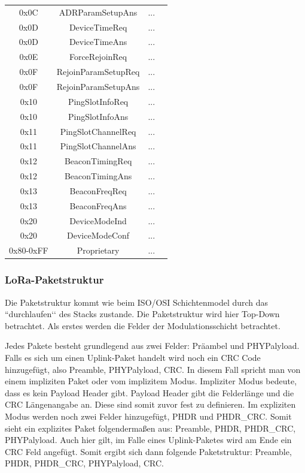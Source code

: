 \documentclass[a4paper,12pt]{article}
\begin{document}
\begin{longtable}{c |c | p{10.5cm} c}
                    0x0C & ADRParamSetupAns & ... \\
                    0x0D & DeviceTimeReq & ... \\
                    0x0D & DeviceTimeAns & ... \\
                    0x0E & ForceRejoinReq & ... \\
                    0x0F & RejoinParamSetupReq & ... \\
                    0x0F & RejoinParamSetupAns & ... \\
                    0x10 & PingSlotInfoReq & ... \\
                    0x10 & PingSlotInfoAns & ... \\
                    0x11 & PingSlotChannelReq & ... \\
                    0x11 & PingSlotChannelAns & ... \\
                    0x12 & BeaconTimingReq & ... \\
                    0x12 & BeaconTimingAns & ... \\
                    0x13 & BeaconFreqReq & ... \\
                    0x13 & BeaconFreqAns & ... \\
                    0x20 & DeviceModeInd & ... \\
                    0x20 & DeviceModeConf & ... \\
                    0x80-0xFF & Proprietary & ... \\
                    
                    
                \end{longtable}
                


            \subsubsection{LoRa-Paketstruktur}
                Die Paketstruktur kommt wie beim ISO/OSI Schichtenmodel durch das ``durchlaufen‘‘ des Stacks zustande. 
                Die Paketstruktur wird hier Top-Down betrachtet. Als erstes werden die Felder
                der Modulationsschicht betrachtet.

                Jedes Pakete besteht grundlegend aus zwei Felder: Präambel und PHYPalyload. Falls es sich um einen 
                Uplink-Paket handelt wird noch ein CRC Code hinzugefügt, also Preamble, PHYPalyload, CRC. 
                In diesem Fall spricht man von einem impliziten Paket oder vom implizitem Modus. Impliziter Modus bedeute, 
                dass es kein Payload Header gibt. Payload Header gibt die Felderlänge und die CRC Längenangabe an. 
                Diese sind somit zuvor fest zu definieren. Im expliziten Modus werden noch zwei Felder hinzugefügt, 
                PHDR und PHDR\_CRC. Somit sieht ein explizites Paket folgendermaßen aus: Preamble, PHDR, PHDR\_CRC, 
                PHYPalyload. Auch hier gilt, im Falle
                eines Uplink-Paketes wird am Ende ein CRC Feld angefügt. Somit ergibt sich dann folgende Paketstruktur: 
                Preamble, PHDR, PHDR\_CRC, PHYPalyload, CRC.
\end{document}
